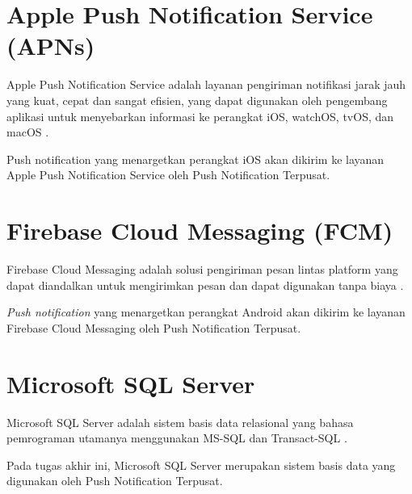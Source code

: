 \section{Apple Push Notification Service (APNs)}
\par Apple Push Notification Service adalah layanan pengiriman notifikasi jarak jauh yang kuat, cepat dan sangat efisien, yang dapat digunakan oleh pengembang aplikasi untuk menyebarkan informasi ke perangkat iOS, watchOS, tvOS, dan macOS \cite{apns-online}.
\par Push notification yang menargetkan perangkat iOS akan dikirim ke layanan Apple Push Notification Service oleh Push Notification Terpusat.

\section{Firebase Cloud Messaging (FCM)}
\par Firebase Cloud Messaging adalah solusi pengiriman pesan lintas platform yang dapat diandalkan untuk mengirimkan pesan dan dapat digunakan tanpa biaya \cite{fcm-online}.
\par \textit{Push notification} yang menargetkan perangkat Android akan dikirim ke layanan Firebase Cloud Messaging oleh Push Notification Terpusat.

\section{Microsoft SQL Server}
\par Microsoft SQL Server adalah sistem basis data relasional yang bahasa pemrograman utamanya menggunakan MS-SQL dan Transact-SQL \cite{sqlserver-thesis}.
\par Pada tugas akhir ini, Microsoft SQL Server merupakan sistem basis data yang digunakan oleh Push Notification Terpusat.

